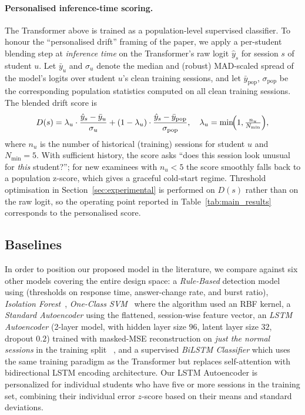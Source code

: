 \documentclass[sigconf]{acmart}
\begin{document}
\paragraph{Personalised inference-time scoring.} The Transformer above is trained as a population-level supervised classifier. To honour the ``personalised drift'' framing of the paper, we apply a per-student blending step at \emph{inference time} on the Transformer's raw logit $\hat{y}_s$ for session $s$ of student $u$. Let $\bar{y}_u$ and $\sigma_u$ denote the median and (robust) MAD-scaled spread of the model's logits over student $u$'s clean training sessions, and let $\bar{y}_{\text{pop}}$, $\sigma_{\text{pop}}$ be the corresponding population statistics computed on all clean training sessions. The blended drift score is
\begin{equation}
D(s) = \lambda_u \cdot \frac{\hat{y}_s - \bar{y}_u}{\sigma_u}
       + (1 - \lambda_u) \cdot \frac{\hat{y}_s - \bar{y}_{\text{pop}}}{\sigma_{\text{pop}}},
\quad \lambda_u = \min\!\Bigl(1, \tfrac{n_u}{N_{\min}}\Bigr),
\end{equation}
where $n_u$ is the number of historical (training) sessions for student $u$ and $N_{\min} = 5$. With sufficient history, the score asks ``does this session look unusual for \emph{this} student?''; for new examinees with $n_u < 5$ the score smoothly falls back to a population z-score, which gives a graceful cold-start regime. Threshold optimisation in Section~\ref{sec:experimental} is performed on $D(s)$ rather than on the raw logit, so the operating point reported in Table~\ref{tab:main_results} corresponds to the personalised score.

\subsection{Baselines}
\label{sec:baselines}
In order to position our proposed model in the literature, we compare against six other models covering the entire design space: a \emph{Rule-Based} detection model using (thresholds on response time, answer-change rate, and burst ratio), \emph{Isolation Forest}~\cite{liu2008isolation}, \emph{One-Class SVM}~\cite{scholkopf2001estimating} where the algorithm used an RBF kernel, a \emph{Standard Autoencoder} using the flattened, session-wise feature vector, an \emph{LSTM Autoencoder} (2-layer model, with hidden layer size $96$, latent layer size $32$, dropout $0.2$) trained with masked-MSE reconstruction on \emph{just the normal sessions} in the training split ~\cite{malhotra2016lstm}, and a supervised \emph{BiLSTM Classifier} which uses the same training paradigm as the Transformer but replaces self-attention with bidirectional LSTM encoding architecture. Our LSTM Autoencoder is personalized for individual students who have five or more sessions in the training set, combining their individual error $z$-score based on their means and standard deviations.
\end{document}
